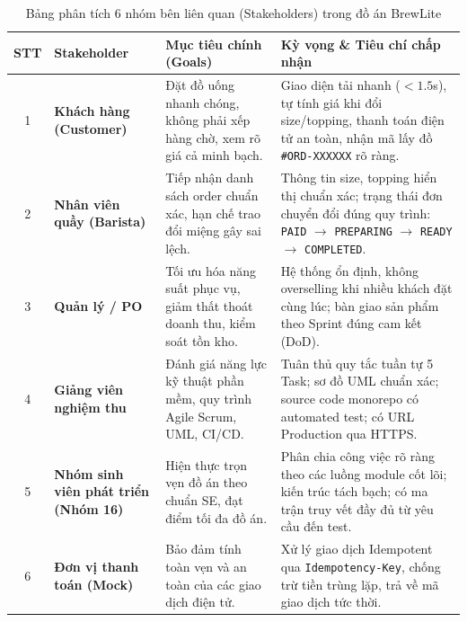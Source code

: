 \documentclass[a4paper]{article}
\begin{document}
\begin{table}[H]
\centering
\small
\begin{tabular}{|c|>{\raggedright\arraybackslash}p{2.6cm}|>{\raggedright\arraybackslash}p{3.8cm}|>{\raggedright\arraybackslash}p{7.2cm}|}
\hline
\textbf{STT} & \textbf{Stakeholder} & \textbf{Mục tiêu chính (Goals)} & \textbf{Kỳ vọng \& Tiêu chí chấp nhận} \\ \hline
1 & \textbf{Khách hàng (Customer)} & Đặt đồ uống nhanh chóng, không phải xếp hàng chờ, xem rõ giá cả minh bạch. & Giao diện tải nhanh ($<1.5$s), tự tính giá khi đổi size/topping, thanh toán điện tử an toàn, nhận mã lấy đồ \texttt{\#ORD-XXXXXX} rõ ràng. \\ \hline
2 & \textbf{Nhân viên quầy (Barista)} & Tiếp nhận danh sách order chuẩn xác, hạn chế trao đổi miệng gây sai lệch. & Thông tin size, topping hiển thị chuẩn xác; trạng thái đơn chuyển đổi đúng quy trình: \texttt{PAID} $\rightarrow$ \texttt{PREPARING} $\rightarrow$ \texttt{READY} $\rightarrow$ \texttt{COMPLETED}. \\ \hline
3 & \textbf{Quản lý / PO} & Tối ưu hóa năng suất phục vụ, giảm thất thoát doanh thu, kiểm soát tồn kho. & Hệ thống ổn định, không overselling khi nhiều khách đặt cùng lúc; bàn giao sản phẩm theo Sprint đúng cam kết (DoD). \\ \hline
4 & \textbf{Giảng viên nghiệm thu} & Đánh giá năng lực kỹ thuật phần mềm, quy trình Agile Scrum, UML, CI/CD. & Tuân thủ quy tắc tuần tự 5 Task; sơ đồ UML chuẩn xác; source code monorepo có automated test; có URL Production qua HTTPS. \\ \hline
5 & \textbf{Nhóm sinh viên phát triển (Nhóm 16)} & Hiện thực trọn vẹn đồ án theo chuẩn SE, đạt điểm tối đa đồ án. & Phân chia công việc rõ ràng theo các luồng module cốt lõi; kiến trúc tách bạch; có ma trận truy vết đầy đủ từ yêu cầu đến test. \\ \hline
6 & \textbf{Đơn vị thanh toán (Mock)} & Bảo đảm tính toàn vẹn và an toàn của các giao dịch điện tử. & Xử lý giao dịch Idempotent qua \texttt{Idempotency-Key}, chống trừ tiền trùng lặp, trả về mã giao dịch tức thời. \\ \hline
\end{tabular}
\caption{Bảng phân tích 6 nhóm bên liên quan (Stakeholders) trong đồ án BrewLite}
\label{tab:stakeholders}
\end{table}
\end{document}
